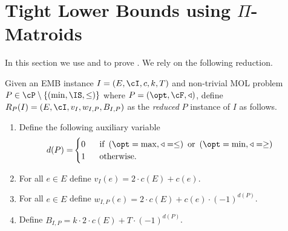 \section{Tight Lower Bounds using $\Pi$-Matroids}
\label{sec:tight_absolute}
In this section we use  and  to prove . We rely on the following reduction.

\begin{definition}
	Given an \textnormal{EMB} instance $I =(E,\cI,c,k,T)$ and non-trivial  \textnormal{MOL} problem $P \in \cP \setminus \{(\min,\IS,\leq)\}$ where $P = (\opt,\cF,\triangleleft)$, define $R_P(I) = (E,\cI,v_I,w_{I,P},B_{I,P})$ as the {\em reduced} $P$ instance of $I$ as follows.
	\begin{enumerate}
		\item Define the following auxiliary variable \begin{align*}
			d(P) = & \begin{cases}
				0 & ~~\text{if  } \left(\opt = \max, \triangleleft = \leq \right) \text{ or } \left(\opt = \min, \triangleleft = \geq \right) \\
			1 & ~~\text{otherwise.}
			\end{cases}
		\end{align*}
		
		\item For all $e \in E$ define $v_I(e) = 2 \cdot c(E)+c(e)$. 
		\item For all $e \in E$ define $w_{I,P}(e) = 2 \cdot c(E)+c(e) \cdot (-1)^{d(P)}$.
		\item Define $B_{I,P} = k \cdot 2 \cdot c(E)+T \cdot  (-1)^{d(P)}$. 
	\end{enumerate}
\end{definition}








